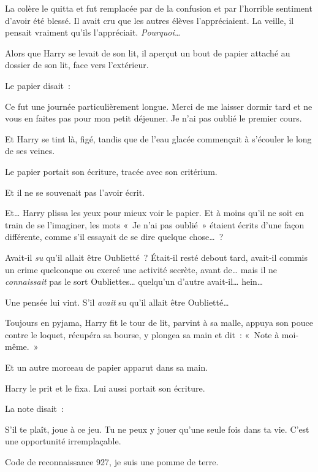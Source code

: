 La colère le quitta et fut remplacée par de la confusion et par l'horrible sentiment d'avoir été blessé. Il avait cru que les autres élèves l'appréciaient. La veille, il pensait vraiment qu'ils l'appréciait. \emph{Pourquoi…}

Alors que Harry se levait de son lit, il aperçut un bout de papier attaché au dossier de son lit, face vers l'extérieur.

Le papier disait~:

\begin{writtenNote}

Ce fut une journée particulièrement longue. Merci de me laisser dormir tard et ne vous en faites pas pour mon petit déjeuner. Je n'ai pas oublié le premier cours.

\end{writtenNote}

Et Harry se tint là, figé, tandis que de l'eau glacée commençait à s'écouler le long de ses veines.

Le papier portait son écriture, tracée avec son critérium.

Et il ne se souvenait pas l'avoir écrit.

Et… Harry plissa les yeux pour mieux voir le papier. Et à moins qu'il ne soit en train de se l'imaginer, les mots «~Je n'ai pas oublié~» étaient écrits d'une façon différente, comme s'il essayait de se dire quelque chose…~?

Avait-il \emph{su} qu'il allait être Oublietté~? Était-il resté debout tard, avait-il commis un crime quelconque ou exercé une activité secrète, avant de… mais il ne \emph{connaissait} pas le sort Oubliettes… quelqu'un d'autre avait-il… hein…

Une pensée lui vint. S'il \emph{avait} su qu'il allait être Oublietté…

Toujours en pyjama, Harry fit le tour de lit, parvint à sa malle, appuya son pouce contre le loquet, récupéra sa bourse, y plongea sa main et dit~: «~Note à moi-même.~»

Et un autre morceau de papier apparut dans sa main.

Harry le prit et le fixa. Lui aussi portait son écriture.

La note disait~:

\begin{writtenNote}

S'il te plaît, joue à ce jeu. Tu ne peux y jouer qu'une seule fois dans ta vie. C'est une opportunité irremplaçable.

Code de reconnaissance 927, je suis une pomme de terre.

\end{writtenNote}

